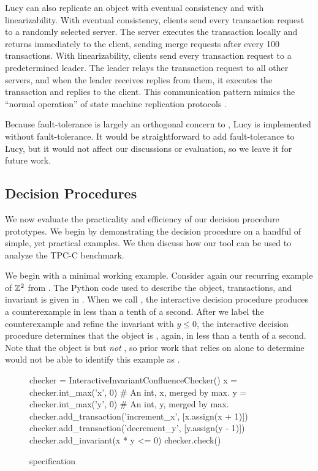 Lucy can also replicate an object with eventual consistency and with
linearizability. With eventual consistency, clients send every transaction
request to a randomly selected server. The server executes the transaction
locally and returns immediately to the client, sending merge requests after
every 100 transactions. With linearizability, clients send every transaction
request to a predetermined leader. The leader relays the transaction request to
all other servers, and when the leader receives replies from them, it executes
the transaction and replies to the client. This communication pattern mimics
the ``normal operation'' of state machine replication protocols
\cite{lamport1998part, liskov2012viewstamped}.

Because fault-tolerance is largely an orthogonal concern to
\invariantconfluence{}, Lucy is implemented without fault-tolerance. It would
be straightforward to add fault-tolerance to Lucy, but it would not affect our
discussions or evaluation, so we leave it for future work.

\subsection{Decision Procedures}
We now evaluate the practicality and efficiency of our decision procedure
prototypes. We begin by demonstrating the decision procedure on a handful of
simple, yet practical examples. We then discuss how our tool can be used to
analyze the TPC-C benchmark.

\example[$\ints^2$]
We begin with a minimal working example. Consider again our recurring example
of $\ints^2$ from . The Python code used to describe the object,
transactions, and invariant is given in . When we call
, the interactive decision procedure produces a
counterexample in less than a tenth of a second.  After we label the
counterexample and refine the invariant with $y \leq 0$, the interactive
decision procedure determines that the object is \invariantconfluent{}, again,
in less than a tenth of a second. Note that the object is \invariantconfluent{}
but \emph{not} \invariantclosed{}, so prior work that relies on
\invariantclosure{} alone to determine \invariantconfluence{} would not be able
to identify this example as \invariantconfluent{}.

\begin{figure}[ht]
  \begin{Python}[gobble=4]
    checker = InteractiveInvariantConfluenceChecker()
    x = checker.int_max('x', 0) # An int, x, merged by max.
    y = checker.int_max('y', 0) # An int, y, merged by max.
    checker.add_transaction('increment_x', [x.assign(x + 1)])
    checker.add_transaction('decrement_y', [y.assign(y - 1)])
    checker.add_invariant(x * y <= 0)
    checker.check()
  \end{Python}
  \caption{ specification}
\end{figure}

